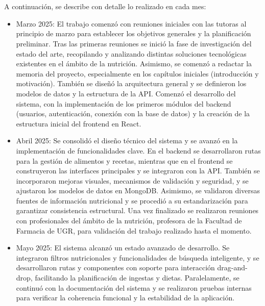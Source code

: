 \noindent
{}
\\
\\
A continuación, se describe con detalle lo realizado en cada mes:
\begin{itemize}
    \item Marzo 2025: El trabajo comenzó con reuniones iniciales con las tutoras al principio de marzo para establecer los objetivos generales y la planificación preliminar. Tras las primeras reuniones se inició la fase de investigación del estado del arte, recopilando y analizando distintas soluciones tecnológicas existentes en el ámbito de la nutrición. Asimismo, se comenzó a redactar la memoria del proyecto, especialmente en los capítulos iniciales (introducción y motivación). También se diseñó la arquitectura general y se definieron los modelos de datos y la estructura de la API. Comenzó el desarrollo del sistema, con la implementación de los primeros módulos del backend (usuarios, autenticación, conexión con la base de datos) y la creación de la estructura inicial del frontend en React.

    \item Abril 2025: Se consolidó el diseño técnico del sistema y se avanzó en la implementación de funcionalidades clave. En el backend se desarrollaron rutas para la gestión de alimentos y recetas, mientras que en el frontend se construyeron las interfaces principales y se integraron con la API. También se incorporaron mejoras visuales, mecanismos de validación y seguridad, y se ajustaron los modelos de datos en MongoDB. Asimismo, se validaron diversas fuentes de información nutricional y se procedió a su estandarización para garantizar consistencia estructural. Una vez finalizado se realizaron reuniones con profesionales del ámbito de la nutrición, profesora de la Facultad de Farmacia de UGR, para validación del trabajo realizado hasta el momento.

    \item Mayo 2025: El sistema alcanzó un estado avanzado de desarrollo. Se integraron filtros nutricionales y funcionalidades de búsqueda inteligente, y se desarrollaron rutas y componentes con soporte para interacción drag-and-drop, facilitando la planificación de ingestas y dietas. Paralelamente, se continuó con la documentación del sistema y se realizaron pruebas internas para verificar la coherencia funcional y la estabilidad de la aplicación.
    

\end{itemize}
